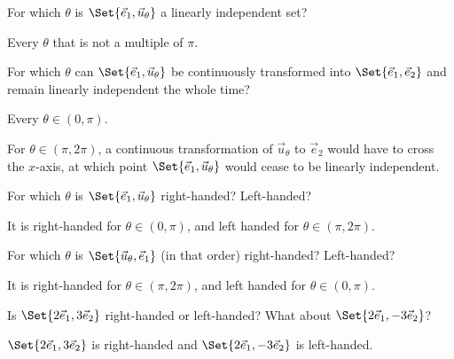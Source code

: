 \documentclass{problemset}
\newcommand{\xhat}{{\vec e_1}}
\newcommand{\yhat}{{\vec e_2}}
\begin{document}
	\begin{parts}
		\item For which $\theta$ is $\Set{\xhat,\vec u_{\theta}}$ a linearly independent set?
			\begin{solution}[inline]
				Every $\theta$ that is not a multiple of $\pi$.
			\end{solution}
		\item For which $\theta$ can $\Set{\xhat,\vec u_{\theta}}$ be continuously
			transformed into $\Set{\xhat,\yhat}$ and remain linearly independent the
			whole time?
			\begin{solution}
				Every $\theta \in (0, \pi)$.

				For $\theta\in(\pi,2\pi)$, a continuous transformation of
				$\vec u_\theta$	to $\yhat$ would have to cross the $x$-axis,
				at which point $\Set{\xhat,\vec u_\theta}$ would cease to be
				linearly independent.
			\end{solution}
		\item For which $\theta$ is $\Set{\xhat,\vec u_{\theta}}$ right-handed?
			Left-handed?
			\begin{solution}
				It is right-handed for $\theta\in(0, \pi)$, and left handed for
				$\theta\in(\pi,2\pi)$.
			\end{solution}
		\item For which $\theta$ is $\Set{\vec u_{\theta},\xhat}$ (in that order)
			right-handed? Left-handed?
			\begin{solution}
				It is right-handed for $\theta\in(\pi,2\pi)$, and left handed
				for $\theta\in(0,\pi)$.
			\end{solution}
		\item Is $\Set{2\xhat, 3\yhat}$ right-handed or left-handed? What about $\Set{2\xhat, -3\yhat}$?
			\begin{solution}
				$\Set{2\xhat, 3\yhat}$ is right-handed and $\Set{2\xhat, -3\yhat}$ is left-handed.
			\end{solution}
	\end{parts}
\end{document}

